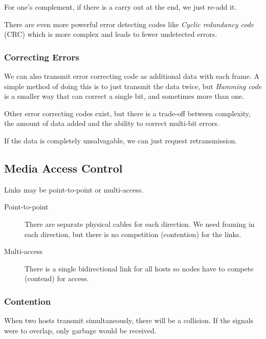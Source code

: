 \begin{note}
	For one's complement, if there is a carry out at the end, we just re-add it.
\end{note}

\begin{note}
	There are even more powerful error detecting codes like \emph{Cyclic redundancy code} (CRC) which is more complex and leads to fewer undetected errors.
\end{note}

\subsubsection{Correcting Errors}\label{ssub:correcting_errors}

We can also transmit error correcting code as additional data with each frame.
A simple method of doing this is to just transmit the data twice, but \emph{Hamming code} is a smaller way that can correct a single bit, and sometimes more than one.

Other error correcting codes exist, but there is a trade-off between complexity, the amount of data added and the ability to correct multi-bit errors.

\begin{note}
	If the data is completely unsalvagable, we can just request retransmission.
\end{note}

\subsection{Media Access Control}\label{sub:media_access_control}

Links may be point-to-point or multi-access.
\begin{description}
	\item[Point-to-point] There are separate physical cables for each direction.
	      We need framing in each direction, but there is no competition (contention) for the links.
	\item[Multi-access] There is a single bidirectional link for all hosts so nodes have to compete (contend) for access.
\end{description}

\subsubsection{Contention}\label{ssub:contention}

When two hosts transmit simultaneously, there will be a collision.
If the signals were to overlap, only garbage would be received.

